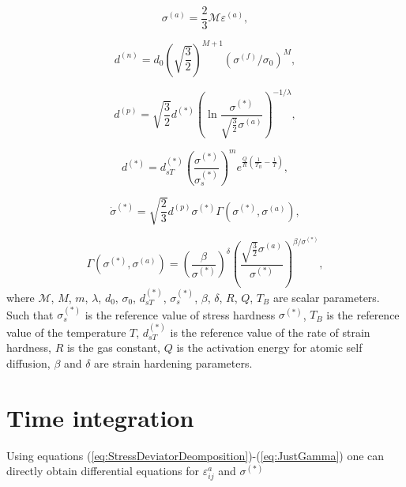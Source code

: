 \begin{equation}\label{eq:AnElasticStressInvariant}
\sigma^{(a)}= \frac{2}{3} \mathcal{M} \varepsilon^{(a)},
\end{equation}

\begin{equation}\label{eq:NonElasticStrainRateInvariant}
d^{(n)}=d_0 \left(\sqrt{\frac{3}{2}} \right)^{\mathit{M}+1}(\sigma^{(f)}/\sigma_0)^{\mathit{M}},
\end{equation}

\begin{equation}\label{eq:PlasticStrainRateInvariant}
d^{(p)}=\sqrt{\frac{3}{2}}d^{(*)}\left( \ln \frac{\sigma^{(*)}}{\sqrt{\frac{3}{2}}\sigma^{(a)}}\right)^{-1/\lambda},
\end{equation}

\begin{equation}\label{eq:StrainHardnessRate}
d^{(*)}=d^{(*)}_{sT}\left(\frac{\sigma^{(*)}}{\sigma^{(*)}_s}\right)^{m} e^{\frac{Q}{R}\left(\frac{1}{T_B}-\frac{1}{T}\right)},
\end{equation}


\begin{equation}\label{eq:StressHardnessRate}
\dot{\sigma}^{(*)}=\sqrt{\frac{2}{3}}d^{(p)} \sigma^{(*)} \Gamma(\sigma^{(*)},\sigma^{(a)}),
\end{equation}

\begin{equation}\label{eq:JustGamma}
\Gamma(\sigma^{(*)},\sigma^{(a)})=\left(\frac{\beta}{\sigma^{(*)}}\right)^{\delta}\left(\frac{\sqrt{\frac{3}{2}}\sigma^{(a)}}{\sigma^{(*)}}\right)^{\beta/\sigma^{(*)}},
\end{equation}
where $\mathcal{M}$, $\mathit{M}$, $m$, $\lambda$, $d_0$, $\sigma_0$, $d^{(*)}_{sT}$, $\sigma^{(*)}_s$, $\beta$, $\delta$, $R$, $Q$, $T_B$  are scalar parameters. Such that $\sigma^{(*)}_s$ is the reference value of stress hardness $\sigma^{(*)}$, $T_B$ is the reference value of the temperature $T$, $d^{(*)}_{sT}$ is the reference value of the rate of strain hardness, $R$ is the gas constant, $Q$ is the activation energy for atomic self diffusion, $\beta$ and $\delta$ are strain hardening parameters. 

\section{Time integration}\label{sec:LargeViscoplacticity:HartModelTimeIntegration}
Using equations (\ref{eq:StressDeviatorDeomposition})-(\ref{eq:JustGamma}) one can directly obtain differential equations for  $\varepsilon^{a}_{ij}$ and $\sigma^{(*)}$


